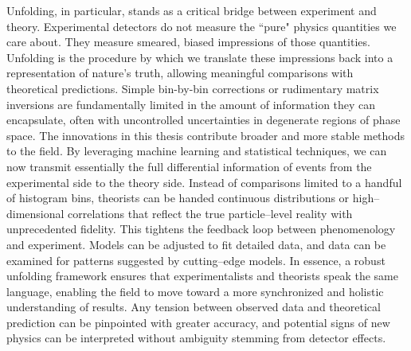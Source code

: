     Unfolding, in particular, stands as a critical bridge between experiment and theory.
    Experimental detectors do not measure the ``pure" physics quantities we care about.
    They measure smeared, biased impressions of those quantities.
    Unfolding is the procedure by which we translate these impressions back into a representation of nature's truth, allowing meaningful comparisons with theoretical predictions.
    Simple bin-by-bin corrections or rudimentary matrix inversions are fundamentally limited in the amount of information they can encapsulate, often with uncontrolled uncertainties in degenerate regions of phase space.
    The innovations in this thesis contribute broader and more stable methods to the field.
    By leveraging machine learning and statistical techniques, we can now transmit essentially the full differential information of events from the experimental side to the theory side.
    Instead of comparisons limited to a handful of histogram bins, theorists can be handed continuous distributions or high--dimensional correlations that reflect the true particle--level reality with unprecedented fidelity.
    This tightens the feedback loop between phenomenology and experiment.
    Models can be adjusted to fit detailed data, and data can be examined for patterns suggested by cutting--edge models.
    In essence, a robust unfolding framework ensures that experimentalists and theorists speak the same language, enabling the field to move toward a more synchronized and holistic understanding of results.
    Any tension between observed data and theoretical prediction can be pinpointed with greater accuracy, and potential signs of new physics can be interpreted without ambiguity stemming from detector effects.
                
